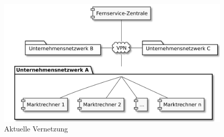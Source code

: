 \documentclass[11pt,a4paper]{report}
\begin{document}

\begin{figure}[h]
\centering
\includegraphics[scale=0.2]{images/problemfeld.pdf}
\caption{Aktuelle Vernetzung}
\label{fig:current_setup}
\end{figure}
\end{document}
